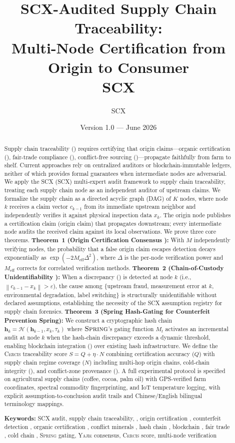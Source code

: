 \documentclass[11pt,a4paper]{article}
\title{\textbf{SCX-Audited Supply Chain Traceability:}\\
\large Multi-Node Certification from Origin to Consumer\\
\small SCX}
\author{SCX}
\date{Version 1.0 --- June 2026}
\theoremstyle{definition}
\theoremstyle{remark}
\newcommand{\SCX}{\textsc{SCX}}
\newcommand{\Yajie}{\textsc{Yajie}}
\newcommand{\Spring}{\textsc{Spring}}
\newcommand{\Cercis}{\textsc{Cercis}}
\newcommand{\norm}[1]{\left\lVert#1\right\rVert}
\newcommand{\hashFunc}{\mathcal{H}}
\newcommand{\hashChain}{\mathbf{h}}
\begin{document}
\maketitle

\begin{abstract}
Supply chain traceability () requires certifying that origin claims---organic certification (), fair-trade compliance (), conflict-free sourcing ()---propagate faithfully from farm to shelf. Current approaches rely on centralized auditors or blockchain-immutable ledgers, neither of which provides formal guarantees when intermediate nodes are adversarial. We apply the \SCX{} (SCX) multi-expert audit framework to supply chain traceability, treating each supply chain node as an independent auditor of upstream claims. We formalize the supply chain as a directed acyclic graph (DAG) of $K$ nodes, where node $k$ receives a claim vector $c_{k-1}$ from its immediate upstream neighbor and independently verifies it against physical inspection data $x_k$. The origin node publishes a certification claim (origin claim) that propagates downstream; every intermediate node audits the received claim against its local observations. We prove three core theorems. \textbf{Theorem~1 (Origin Certification Consensus ):} With $M$ independently verifying nodes, the probability that a false origin claim escapes detection decays exponentially as $\exp(-2M_{\mathrm{eff}} \Delta^2)$, where $\Delta$ is the per-node verification power and $M_{\mathrm{eff}}$ corrects for correlated verification methods. \textbf{Theorem~2 (Chain-of-Custody Unidentifiability ):} When a discrepancy () is detected at node $k$ (i.e., $\norm{c_{k-1} - x_k} > \varepsilon$), the cause among \{upstream fraud, measurement error at $k$, environmental degradation, label switching\} is structurally unidentifiable without declared assumptions, establishing the necessity of the SCX assumption registry for supply chain forensics. \textbf{Theorem~3 (Spring Hash-Gating for Counterfeit Prevention Spring):} We construct a cryptographic hash chain $\hashChain_k = \hashFunc(\hashChain_{k-1}, x_k, \tau_k)$ where $\Spring$'s gating function $M_t$ activates an incremental audit at node $k$ when the hash-chain discrepancy exceeds a dynamic threshold, enabling blockchain integration () over existing hash infrastructure. We define the \Cercis{} traceability score $S = Q + \eta \cdot N$ combining certification accuracy ($Q$) with supply chain regime coverage ($N$) including multi-hop origin chains, cold-chain integrity (), and conflict-zone provenance (). A full experimental protocol is specified on agricultural supply chains (coffee, cocoa, palm oil) with GPS-verified farm coordinates, spectral commodity fingerprinting, and IoT temperature logging, with explicit assumption-to-conclusion audit trails and Chinese/English bilingual terminology mappings.

\medskip
\noindent\textbf{Keywords:} SCX audit, supply chain traceability, , origin certification , counterfeit detection , organic certification , conflict minerals , hash chain , blockchain , fair trade , cold chain , \Spring{} gating, \Yajie{} consensus, \Cercis{} score, multi-node verification 
\end{abstract}
\end{document}
